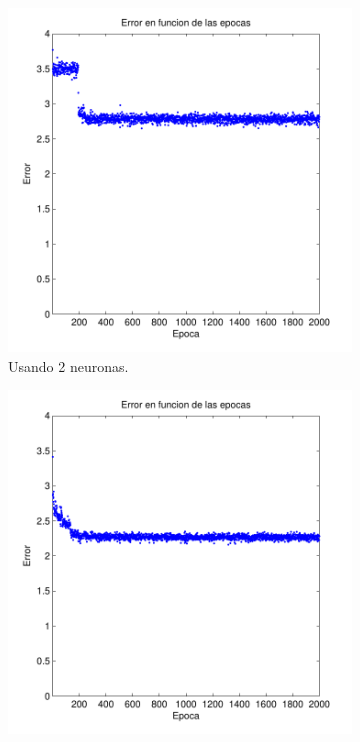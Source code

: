 \documentclass[informe.tex]{subfiles}
\begin{document}
    \begin{figure}[H]
        \centering
        \begin{subfigure}[b]{0.32\textwidth}
                \includegraphics[width=\textwidth]{graficos/error_fold2_2_binary-regresion_2000_01.pdf}
                \caption{Usando 2 neuronas.}
                \label{fig:d2-f2-2k-01-n2}
        \end{subfigure}
        \begin{subfigure}[b]{0.32\textwidth}
                \includegraphics[width=\textwidth]{graficos/error_fold2_4_binary-regresion_2000_01.pdf}

\end{subfigure}
\end{figure}
\end{document}
